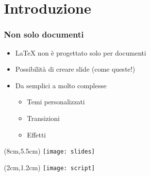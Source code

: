 \section{Introduzione}
\begin{frame}
 
 \frametitle{Non solo documenti}
 
 \begin{itemize}
  \item<1-> \LaTeX{} non è progettato solo per documenti
  \item<2-> Possibilità di creare slide (come queste!)
  \item<3-> Da semplici a molto complesse
  \begin{itemize}
   \item Temi personalizzati
   \item Transizioni
   \item Effetti
  \end{itemize}

 \end{itemize}
 
 \begin{textblock*}{5cm}(8cm,5.5cm)
   \texttt{[image: slides]}
 \end{textblock*}
 
 \begin{textblock*}{5cm}(2cm,1.2cm)
   \texttt{[image: script]}
 \end{textblock*}
\end{frame}
